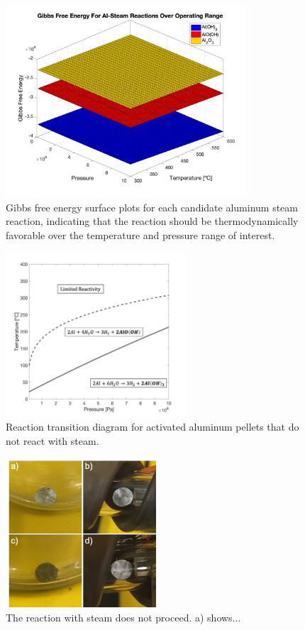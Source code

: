 \documentclass[preprint,12pt,3p]{elsarticle}
\begin{document}
\begin{figure}
  \centering
  \includegraphics[width=0.8\textwidth]{fig/gibbs_steam_total_surface}
  \caption{Gibbs free energy surface plots for each candidate aluminum steam
  reaction, indicating that the reaction should be thermodynamically favorable
over the temperature and pressure range of interest.}
  \label{fig:gibbs_steam_surface}
\end{figure}

\begin{figure}
  \centering
  \includegraphics[width=0.6\textwidth]{fig/transitions_bp}
  \caption{Reaction transition diagram for activated aluminum pellets that do
  not react with steam.}
  \label{fig:transitions_bp}
\end{figure}

\begin{figure}
  \centering
  \includegraphics[width=0.5\textwidth]{fig/steam_test_min}
  \caption{The reaction with steam does not proceed. a) shows...}
  \label{fig:steam_test}
\end{figure}
\end{document}
